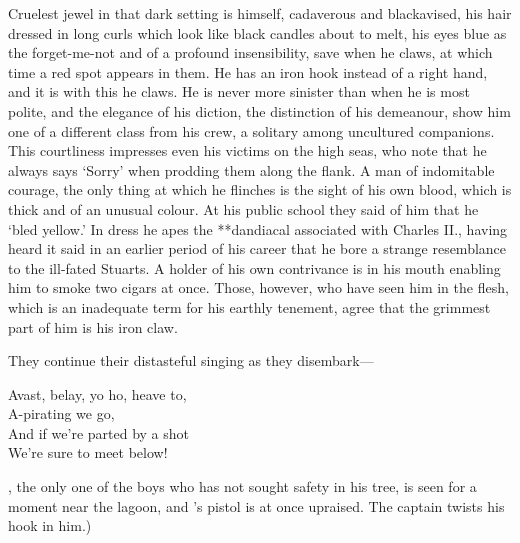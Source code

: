 \begin{stagedir}
Cruelest jewel in that dark setting is \hook himself, cadaverous and blackavised,
his hair dressed in long curls which look like black candles about to melt,
his eyes blue as the forget-me-not and of a profound insensibility,
save when he claws, at which time a red spot appears in them.
He has an iron hook instead of a right hand, and it is with this he claws.
He is never more sinister than when he is most polite,
and the elegance of his diction, the distinction of his demeanour,
show him one of a different class from his crew, a solitary among uncultured companions.
This courtliness impresses even his victims on the high seas,
who note that he always says ‘Sorry’ when prodding them along the flank.
A man of indomitable courage,
the only thing at which he flinches is the sight of his own blood, which is thick and of an unusual colour.
At his public school they said of him that he ‘bled yellow.’
In dress he apes the **dandiacal associated with Charles II.,
having heard it said in an earlier period of his career that he bore a strange resemblance to the ill-fated Stuarts.
A holder of his own contrivance is in his mouth enabling him to smoke two cigars at once.
Those, however, who have seen him in the flesh, which is an inadequate term for his earthly tenement,
agree that the grimmest part of him is his iron claw.

They continue their distasteful singing as they disembark—

\begin{drama}
\speakercontinues
	Avast, belay, yo ho, heave to,\\
	A-pirating we go,\\
	And if we’re parted by a shot\\
	We’re sure to meet below!
\end{drama}

\nibs, the only one of the boys who has not sought safety in his tree, is seen for a moment near the lagoon,
and \starkey’s pistol is at once upraised.
The captain twists his hook in him.)
\end{stagedir}

